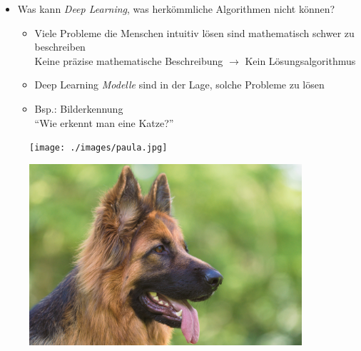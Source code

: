 \documentclass[t]{beamer}
\begin{document}
\begin{frame}
\begin{itemize}
    \item Was kann \emph{Deep Learning}, was herkömmliche Algorithmen nicht können?
    \begin{itemize}
        \item Viele Probleme die Menschen intuitiv lösen sind mathematisch schwer zu beschreiben \\
        Keine präzise mathematische Beschreibung \(\rightarrow\) Kein Lösungsalgorithmus
        \item Deep Learning \emph{Modelle} sind in der Lage, solche Probleme zu lösen \newline
        \item Bsp.: Bilderkennung \\
        \enquote{Wie erkennt man eine Katze?}
    \end{itemize}
\end{itemize}
\begin{figure}
    \centering
    \begin{minipage}{0.5\textwidth}
        \centering
        \texttt{[image: ./images/paula.jpg]} %
    \end{minipage}\hfill
    \begin{minipage}{0.5\textwidth}
        \centering
        \includegraphics[width=0.9\textwidth]{./images/deutscher-schaeferhund.jpg} %
    \end{minipage}
\end{figure}
\end{frame}
\end{document}
